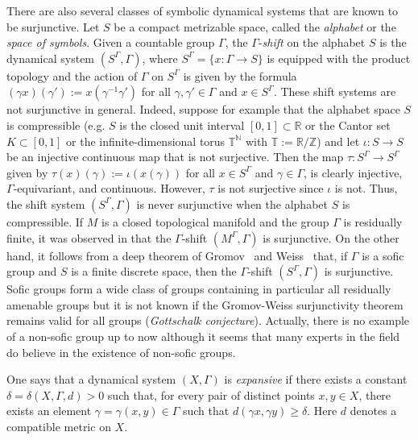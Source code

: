 \documentclass[12pt,a4paper]{amsart}
\theoremstyle{definition}
\numberwithin{equation}{section}
\begin{document}
There are also several classes of symbolic dynamical systems that are known to be surjunctive. Let $S$ be a  compact metrizable 
space, called the \emph{alphabet} or the \emph{space of symbols}.
   Given a countable group $\Gamma$,  the 
  $\Gamma$-\emph{shift} on the alphabet $S$ is the dynamical system   $(S^\Gamma, \Gamma)$,
  where $S^\Gamma = \{x \colon \Gamma \to S\}$ is equipped with the product  topology  and the action of $\Gamma$ on 
  $S^\Gamma$ is given by the formula $(\gamma x)(\gamma') := x(\gamma^{-1} \gamma')$ for 
  all $\gamma,\gamma' \in \Gamma$ and $x \in S^\Gamma$. 
These shift systems are not surjunctive in general.
Indeed, suppose  for example that the alphabet space $S$ is compressible (e.g. $S$ is the closed unit interval $[0,1] \subset {\mathbb{R}}$
or the Cantor set $K \subset [0,1]$ or the infinite-dimensional torus
${\mathbb{T}}^{\mathbb{N}}$ with ${\mathbb{T}} := {\mathbb{R}}/{\mathbb{Z}}$) and let $\iota \colon S \to S$ be an injective continuous map that is not surjective. 
Then the map $\tau \colon S^\Gamma \to S^\Gamma$ given by
$\tau(x)(\gamma) := \iota(x(\gamma))$ for all $x \in S^\Gamma$ and $\gamma \in \Gamma$,
is clearly   injective, $\Gamma$-equivariant, and continuous.
However, $\tau$ is  not surjective since $\iota$ is not.
Thus, the shift system $(S^\Gamma,\Gamma)$ is never surjunctive when the alphabet  $S$ is compressible.
If $M$ is a closed topological manifold and the group $\Gamma$ is residually finite, 
it was observed in \cite[Corollary~7.8]{csc-concrete} that  the 
$\Gamma$-shift
$(M^\Gamma,\Gamma)$ is surjunctive.
 On the other hand, it follows from a deep theorem of Gromov~\cite{gromov-esav} and 
 Weiss~\cite{weiss-sgds} that,   if $\Gamma$ is a sofic group and $S$ is a finite discrete space, then
 the $\Gamma$-shift  $(S^\Gamma,\Gamma)$  is surjunctive.
Sofic groups form a wide class of groups containing in particular all residually amenable  groups
 but it is not known if the Gromov-Weiss surjunctivity theorem remains valid  for all groups (\emph{Gottschalk conjecture}). Actually, there is no example of a non-sofic group up to now
 although it seems that many experts in the field do believe in the existence of non-sofic groups.
 \par
 One says that a dynamical system  $(X,\Gamma)$ is \emph{expansive} if there exists a constant 
$\delta = \delta(X,\Gamma,d)  > 0$ such that, for every pair of distinct points $x,y \in X$, there exists an element
$\gamma = \gamma(x,y)  \in \Gamma$ such that
$d(\gamma  x,\gamma  y) \geq  \delta$. Here $d$ denotes a compatible metric on $X$.
\end{document}
